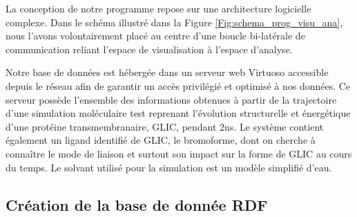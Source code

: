 La conception de notre programme repose sur une architecture logicielle complexe. Dans le schéma illustré dans la Figure \ref{Fig:schema_prog_visu_ana}, nous l'avons volontairement placé au centre d'une boucle bi-latérale de communication reliant l'espace de visualisation à l'espace d'analyse.

Notre base de données est hébergée dans un serveur web Virtuoso accessible depuis le réseau afin de garantir un accès privilégié et optimisé à nos données. Ce serveur possède l'ensemble des informations obtenues à partir de la trajectoire d'une simulation moléculaire test reprenant l'évolution structurelle et énergétique d'une protéine transmembranaire, GLIC, pendant 2ns. Le système contient également un ligand identifié de GLIC, le bromoforme, dont on cherche à connaître le mode de liaison et surtout son impact sur la forme de GLIC au cours du temps. Le solvant utilisé pour la simulation est un modèle simplifié d'eau.

\subsection{Création de la base de donnée RDF}

